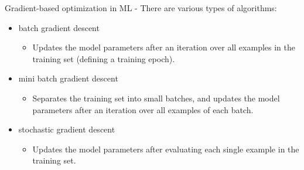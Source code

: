 \begin{frame}[t,allowframebreaks]{
    Gradient-based optimization in ML -}
    There are various types of 
    algorithms:\\
    \begin{itemize}
        \item   
            \Gls{batch gradient descent}\\
            \begin{itemize}
                \item
                    Updates the model parameters 
                    after an iteration over all examples in the training set
                    (defining a training \gls{epoch}).
            \end{itemize}
        \item 
            \Gls{mini batch gradient descent}\\
            \begin{itemize}
                \item   
                    Separates the training set into small batches,
                    and updates the model parameters after an iteration
                    over all examples of each batch.
            \end{itemize}
        \item 
            \Gls{stochastic gradient descent}\\
            \begin{itemize}
                \item   
                    Updates the model parameters after evaluating each
                    single example in the training set.\\
            \end{itemize}
    \end{itemize}

\end{frame}
